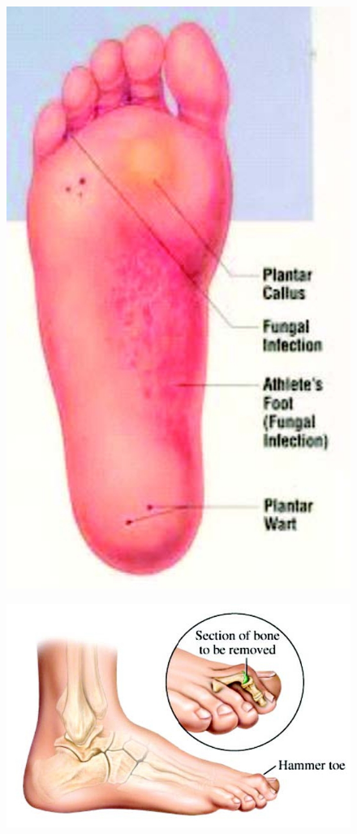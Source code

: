 \begin{figure}
\includegraphics{images/060.jpg}
\end{figure}


\begin{figure}
\includegraphics{images/061.jpg}
\end{figure}


